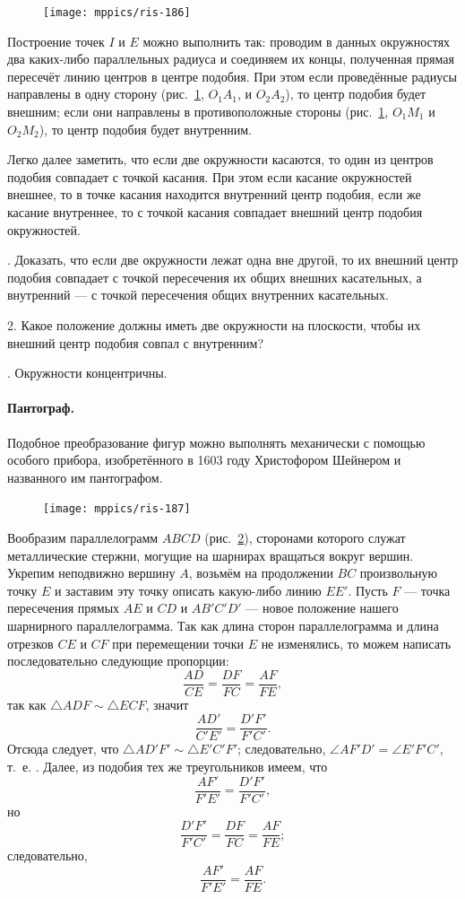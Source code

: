 \documentclass[oneside]{book}
\begin{document}
\begin{figure}[h]
\centering
\texttt{[image: mppics/ris-186]}
\caption{}\label{1938/ris-186}
\end{figure}

Построение точек $I$ и $E$ можно выполнить так:
проводим в данных окружностях два каких-либо параллельных радиуса и соединяем их концы, полученная прямая пересечёт линию центров в центре подобия.
При этом если проведённые радиусы направлены в одну сторону (рис.~\ref{1938/ris-186}, $O_1A_1$, и $O_2A_2$), то центр подобия будет внешним;
если они направлены в противоположные стороны (рис.~\ref{1938/ris-186}, $O_1M_1$ и $O_2M_2$), то центр подобия будет внутренним.

Легко далее заметить, что если две окружности касаются, то один из центров подобия совпадает с точкой касания.
При этом если касание окружностей внешнее, то в точке касания находится внутренний центр подобия, если же касание внутреннее, то с точкой касания совпадает внешний центр подобия окружностей.

.
Доказать, что если две окружности лежат одна вне другой, то их внешний центр подобия совпадает с точкой пересечения их общих внешних касательных, а внутренний — с точкой пересечения общих внутренних касательных.

2.
Какое положение должны иметь две окружности на плоскости, чтобы их внешний центр подобия совпал с внутренним? 

.
Окружности концентричны.

\paragraph{Пантограф.}\label{1938/180} %
Подобное преобразование фигур можно выполнять механически с помощью особого прибора, изобретённого в 1603 году Христофором Шейнером и названного им пантографом. 

\begin{figure}[h]
\centering
\texttt{[image: mppics/ris-187]}
\caption{}\label{1938/ris-187}
\end{figure}

Вообразим параллелограмм $ABCD$ (рис.~\ref{1938/ris-187}), сторонами которого служат металлические стержни, могущие на шарнирах вращаться вокруг вершин.
Укрепим неподвижно вершину $A$, возьмём на продолжении $BC$ произвольную точку $E$ и заставим эту точку описать какую-либо линию $EE'$.
Пусть $F$ — точка пересечения прямых $AE$ и $CD$ и $AB'C'D'$ — новое положение нашего шарнирного параллелограмма.
Так как длина сторон параллелограмма и длина отрезков $CE$ и $CF$ при перемещении точки $E$ не изменялись, то можем написать последовательно следующие пропорции:
\[\frac{AD}{CE}=\frac{DF}{FC}=\frac{AF}{FE},\]
так как $\triangle ADF\sim\triangle ECF$,
значит
\[\frac{AD'}{C'E'}=\frac{D'F'}{F'C'}.\]
Отсюда следует, что $\triangle AD'F'\sim\triangle  E'C'F'$;
следовательно, $\angle AF'D'=\angle E'F'C'$, т.~е.
.
Далее, из подобия тех  же треугольников имеем, что 
\[\frac{AF'}{F'E'}=\frac{D'F'}{F'C'},\]
но
\[\frac{D'F'}{F'C'}=\frac{DF}{FC}=\frac{AF}{FE};\]
следовательно, 
\[\frac{AF'}{F'E'}=\frac{AF}{FE}.\]
\end{document}
